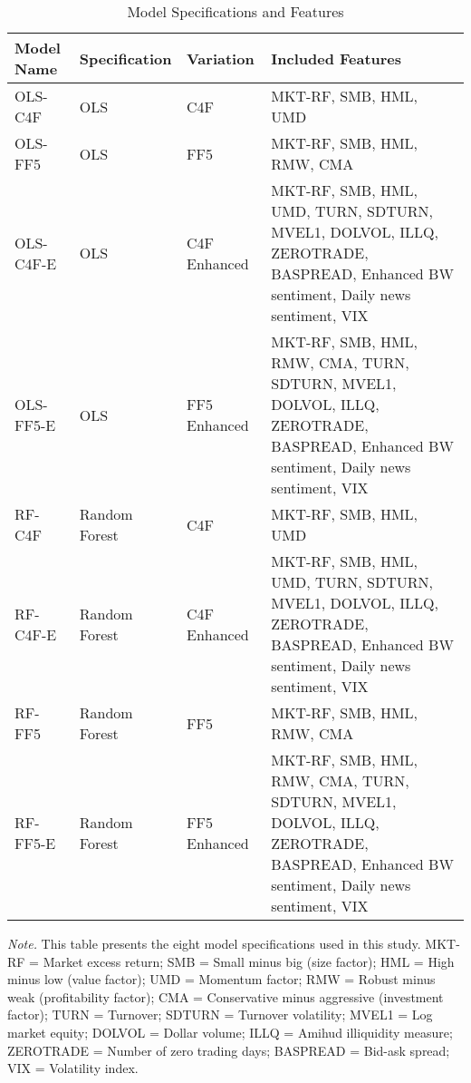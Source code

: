 \begin{table}[H]
\centering
\caption{Model Specifications and Features}
\label{tab:model_specifications}
\footnotesize
\begin{tabular}{p{2.2cm}p{1.8cm}p{2.2cm}p{7.5cm}}
\toprule
\textbf{Model Name} & \textbf{Specification} & \textbf{Variation} & \textbf{Included Features} \\
\midrule

OLS-C4F & OLS & C4F & MKT-RF, SMB, HML, UMD \\
\addlinespace

OLS-FF5 & OLS & FF5 & MKT-RF, SMB, HML, RMW, CMA \\
\addlinespace

OLS-C4F-E & OLS & C4F Enhanced & MKT-RF, SMB, HML, UMD, TURN, SDTURN, MVEL1, DOLVOL, ILLQ, ZEROTRADE, BASPREAD, Enhanced BW sentiment, Daily news sentiment, VIX \\
\addlinespace

OLS-FF5-E & OLS & FF5 Enhanced & MKT-RF, SMB, HML, RMW, CMA, TURN, SDTURN, MVEL1, DOLVOL, ILLQ, ZEROTRADE, BASPREAD, Enhanced BW sentiment, Daily news sentiment, VIX \\
\addlinespace

RF-C4F & Random Forest & C4F & MKT-RF, SMB, HML, UMD \\
\addlinespace

RF-C4F-E & Random Forest & C4F Enhanced & MKT-RF, SMB, HML, UMD, TURN, SDTURN, MVEL1, DOLVOL, ILLQ, ZEROTRADE, BASPREAD, Enhanced BW sentiment, Daily news sentiment, VIX \\
\addlinespace

RF-FF5 & Random Forest & FF5 & MKT-RF, SMB, HML, RMW, CMA \\
\addlinespace

RF-FF5-E & Random Forest & FF5 Enhanced & MKT-RF, SMB, HML, RMW, CMA, TURN, SDTURN, MVEL1, DOLVOL, ILLQ, ZEROTRADE, BASPREAD, Enhanced BW sentiment, Daily news sentiment, VIX \\

\bottomrule
\end{tabular}

\vspace{0.5em}
\begin{minipage}{\textwidth}
\small
\textit{Note.} This table presents the eight model specifications used in this study. MKT-RF = Market excess return; SMB = Small minus big (size factor); HML = High minus low (value factor); UMD = Momentum factor; RMW = Robust minus weak (profitability factor); CMA = Conservative minus aggressive (investment factor); TURN = Turnover; SDTURN = Turnover volatility; MVEL1 = Log market equity; DOLVOL = Dollar volume; ILLQ = Amihud illiquidity measure; ZEROTRADE = Number of zero trading days; BASPREAD = Bid-ask spread; VIX = Volatility index.
\end{minipage}

\end{table}
